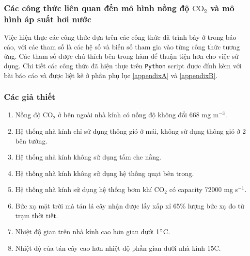 \documentclass[a4paper]{article}
\begin{document}
\subsubsection{Các công thức liên quan đến mô hình nồng độ $\mathrm{CO_2}$ và mô hình áp suất hơi nước}
Việc hiện thực các công thức dựa trên các công thức đã trình bày ở trong báo cáo, với các tham số là các hệ số và biến số tham gia vào từng công thức tương ứng. Các tham số được chú thích bên trong hàm để thuận tiện hơn cho việc sử dụng. Chi tiết các công thức đã hiện thực trên \texttt{Python} script được đính kèm với bài báo cáo và được liệt kê ở phần phụ lục \ref{appendixA} và \ref{appendixB}.
\subsubsection{Các giả thiết}
\begin{enumerate}[nolistsep]
    \item Nồng độ $\mathrm{CO_2}$ ở bên ngoài nhà kính có nồng độ không đổi 668 mg m$^{-3}$.
    \item Hệ thống nhà kính chỉ sử dụng thông gió ở mái, không sử dụng thông gió ở 2 bên tường.
    \item Hệ thống nhà kính không sử dụng tấm che nắng.
    \item Hệ thống nhà kính không sử dụng hệ thống quạt bên trong.
    \item Hệ thống nhà kính sử dụng hệ thống bơm khí $\mathrm{CO_2}$ có capacity 72000 mg s$^{-1}$.
    \item Bức xạ mặt trời mà tán lá cây nhận được lấy xấp xỉ 65\% lượng bức xạ đo từ trạm thời tiết.
    \item Nhiệt độ gian trên nhà kính cao hơn gian dưới 1$\degree$C.
    \item Nhiệt độ của tán cây cao hơn nhiệt độ phần gian dưới nhà kính 15\degree C.
\end{enumerate}

\end{document}

